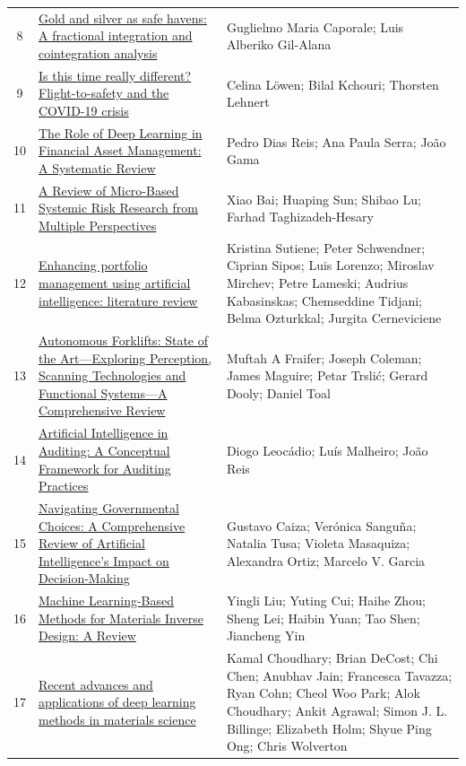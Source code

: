 \documentclass[11pt]{article}
\begin{document}
\begin{longtable}{cp{8cm}p{5cm}}
  8 & \href{https://journals.plos.org/plosone/article?id=10.1371/journal.pone.0282631}{Gold and silver as safe havens: A fractional integration and cointegration analysis} & Guglielmo Maria Caporale; Luis Alberiko Gil-Alana \\
  9 & \href{https://journals.plos.org/plosone/article?id=10.1371/journal.pone.0251752}{Is this time really different? Flight-to-safety and the COVID-19 crisis} & Celina Löwen; Bilal Kchouri; Thorsten Lehnert \\
  10 & \href{https://arxiv.org/abs/2503.01591}{The Role of Deep Learning in Financial Asset Management: A Systematic Review} & Pedro Dias Reis; Ana Paula Serra; João Gama \\
  11 & \href{https://www.mdpi.com/1099-4300/22/7/711}{A Review of Micro-Based Systemic Risk Research from Multiple Perspectives} & Xiao Bai; Huaping Sun; Shibao Lu; Farhad Taghizadeh-Hesary \\
  12 & \href{https://www.frontiersin.org/journals/artificial-intelligence/articles/10.3389/frai.2024.1371502/full}{Enhancing portfolio management using artificial intelligence: literature review} & Kristina Sutiene; Peter Schwendner; Ciprian Sipos; Luis Lorenzo; Miroslav Mirchev; Petre Lameski; Audrius Kabasinskas; Chemseddine Tidjani; Belma Ozturkkal; Jurgita Cerneviciene \\
  13 & \href{https://www.mdpi.com/2079-9292/14/1/153}{Autonomous Forklifts: State of the Art—Exploring Perception, Scanning Technologies and Functional Systems—A Comprehensive Review} & Muftah A Fraifer; Joseph Coleman; James Maguire; Petar Trslić; Gerard Dooly; Daniel Toal \\
  14 & \href{https://www.mdpi.com/2076-3387/14/10/238}{Artificial Intelligence in Auditing: A Conceptual Framework for Auditing Practices} & Diogo Leocádio; Luís Malheiro; João Reis \\
  15 & \href{https://www.mdpi.com/2227-9709/11/3/64}{Navigating Governmental Choices: A Comprehensive Review of Artificial Intelligence's Impact on Decision-Making} & Gustavo Caiza; Verónica Sanguña; Natalia Tusa; Violeta Masaquiza; Alexandra Ortiz; Marcelo V. Garcia \\
  16 & \href{https://www.techscience.com/cmc/v82n2/59511}{Machine Learning-Based Methods for Materials Inverse Design: A Review} & Yingli Liu; Yuting Cui; Haihe Zhou; Sheng Lei; Haibin Yuan; Tao Shen; Jiancheng Yin \\
  17 & \href{https://www.nature.com/articles/s41524-022-00734-6}{Recent advances and applications of deep learning methods in materials science} & Kamal Choudhary; Brian DeCost; Chi Chen; Anubhav Jain; Francesca Tavazza; Ryan Cohn; Cheol Woo Park; Alok Choudhary; Ankit Agrawal; Simon J. L. Billinge; Elizabeth Holm; Shyue Ping Ong; Chris Wolverton \\

\end{longtable}
\end{document}
